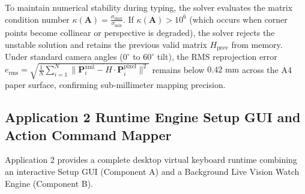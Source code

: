 To maintain numerical stability during typing, the solver evaluates the matrix condition number $\kappa(\mathbf{A}) = \frac{\sigma_{\max}}{\sigma_{\min}}$. If $\kappa(\mathbf{A}) > 10^6$ (which occurs when corner points become collinear or perspective is degraded), the solver rejects the unstable solution and retains the previous valid matrix $H_{\text{prev}}$ from memory. Under standard camera angles ($0^\circ$ to $60^\circ$ tilt), the RMS reprojection error $e_{\text{rms}} = \sqrt{\frac{1}{N} \sum_{i=1}^N \| \mathbf{P}_i^{\text{xml}} - H \cdot \mathbf{P}_i^{\text{pixel}} \|^2}$ remains below $0.42\text{ mm}$ across the A4 paper surface, confirming sub-millimeter mapping precision.

\subsection{Application 2 Runtime Engine Setup GUI and Action Command Mapper}
Application 2 provides a complete desktop virtual keyboard runtime combining an interactive Setup GUI (Component A) and a Background Live Vision Watch Engine (Component B).

